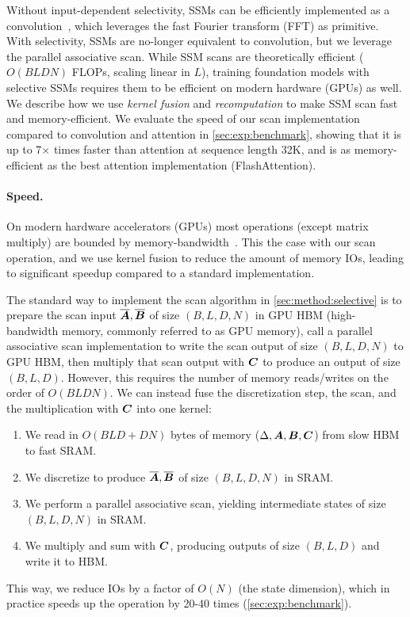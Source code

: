 Without input-dependent selectivity, SSMs can be efficiently implemented as a
convolution~\citep{gu2022efficiently,dao2023hungry}, which leverages the fast
Fourier transform (FFT) as primitive.
With selectivity, SSMs are no-longer equivalent to convolution, but we leverage
the parallel associative scan.
While SSM scans are theoretically efficient ($O(B L D N)$ FLOPs, scaling linear
in $L$), training foundation models with selective SSMs requires them to be efficient on
modern hardware (GPUs) as well.
We describe how we use \emph{kernel fusion} and \emph{recomputation} to make SSM
scan fast and memory-efficient.
We evaluate the speed of our scan implementation compared to
convolution and attention in \cref{sec:exp:benchmark}, showing that it is up to 7$\times$
times faster than attention at sequence length 32K, and is as memory-efficient
as the best attention implementation (FlashAttention).

\paragraph{Speed.}
On modern hardware accelerators (GPUs) most operations (except matrix multiply)
are bounded by
memory-bandwidth~\citep{williams2009roofline,ivanov2021data,dao2022flashattention}.
This the case with our scan operation, and we use
kernel fusion to reduce the amount of memory IOs, leading to significant speedup
compared to a standard implementation.

The standard way to implement the scan algorithm in \cref{sec:method:selective}
is to prepare the scan input $\overline{\bm{A}}, \overline{\bm{B}}$ of size $(B, L, D, N)$ in GPU HBM
(high-bandwidth memory, commonly referred to as GPU memory), call a
parallel associative scan implementation to write the scan output of size
$(B, L, D, N)$ to GPU HBM, then multiply that scan output with $\bm{C}$ to
produce an output of size $(B, L, D)$.
However, this requires the number of memory reads/writes on the order of
$O(BLDN)$.
We can instead fuse the discretization step, the scan, and the multiplication
with $\bm{C}$ into one kernel:
\begin{enumerate}
  \item We read in $O(BLD + DN)$ bytes of memory ($\Delta, \bm{A}, \bm{B}, \bm{C}$) from slow
  HBM to fast SRAM.
  \item We discretize to produce $\overline{\bm{A}}, \overline{\bm{B}}$ of size $(B, L, D, N)$ in SRAM.
  \item We perform a parallel associative scan, yielding intermediate states of
  size $(B, L, D, N)$ in SRAM.
  \item We multiply and sum with $\bm{C}$, producing outputs of size $(B, L, D)$ and
  write it to HBM.
\end{enumerate}
This way, we reduce IOs by a factor of $O(N)$ (the state dimension), which in
practice speeds up the operation by 20-40 times (\cref{sec:exp:benchmark}).

